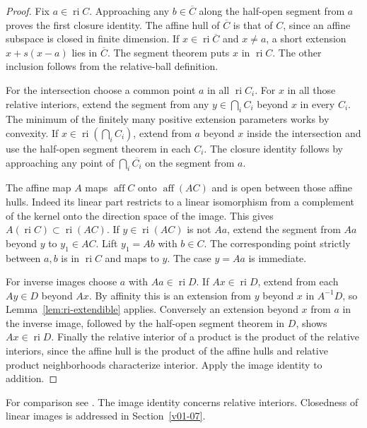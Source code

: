 \documentclass[11pt,oneside,openany]{book}
\theoremstyle{plain}
\theoremstyle{definition}
\theoremstyle{remark}
\begin{document}
\begin{proof}
Fix \(a\in\operatorname{ri}C\). Approaching any \(b\in\overline C\)
along the half-open segment from \(a\) proves the first closure
identity. The affine hull of \(\overline C\) is that of \(C\),
since an affine subspace is closed in finite dimension. If
\(x\in\operatorname{ri}\overline C\) and \(x\neq a\), a short extension
\(x+s(x-a)\) lies in \(\overline C\). The segment theorem puts
\(x\) in \(\operatorname{ri}C\). The other inclusion follows
from the relative-ball definition.

For the intersection choose a common point \(a\) in all
\(\operatorname{ri}C_i\). For \(x\) in all those relative interiors,
extend the segment from any \(y\in\bigcap_i C_i\) beyond \(x\)
in every \(C_i\). The minimum of the finitely many positive extension
parameters works by convexity. If \(x\in\operatorname{ri}(\bigcap_i C_i)\),
extend from \(a\) beyond \(x\) inside the intersection and use
the half-open segment theorem in each \(C_i\). The closure identity
follows by approaching any point of \(\bigcap_i\overline{C_i}\)
on the segment from \(a\).

The affine map \(A\) maps \(\operatorname{aff}C\) onto
\(\operatorname{aff}(AC)\) and is open between those affine hulls.
Indeed its linear part restricts to a linear isomorphism from a
complement of the kernel onto the direction space of the image.
This gives \(A(\operatorname{ri}C)\subset\operatorname{ri}(AC)\).
If \(y\in\operatorname{ri}(AC)\) is not \(Aa\), extend the segment
from \(Aa\) beyond \(y\) to \(y_1\in AC\). Lift \(y_1=Ab\) with
\(b\in C\). The corresponding point strictly between \(a,b\) is
in \(\operatorname{ri}C\) and maps to \(y\). The case \(y=Aa\) is
immediate.

For inverse images choose \(a\) with \(Aa\in\operatorname{ri}D\).
If \(Ax\in\operatorname{ri}D\), extend from each \(Ay\in D\) beyond
\(Ax\). By affinity this is an extension from \(y\) beyond \(x\)
in \(A^{-1}D\), so Lemma~\ref{lem:ri-extendible} applies. Conversely
an extension beyond \(x\) from \(a\) in the inverse image, followed
by the half-open segment theorem in \(D\), shows \(Ax\in\operatorname{ri}D\).
Finally the relative interior of a product is the product of the
relative interiors, since the affine hull is the product of the
affine hulls and relative product neighborhoods characterize
interior. Apply the image identity to addition.
\end{proof}

For comparison see \cite[Theorems 6.3--6.7]{Rockafellar}. The image
identity concerns relative interiors. Closedness of linear images is
addressed in Section~\ref{v01-07}.
\end{document}
